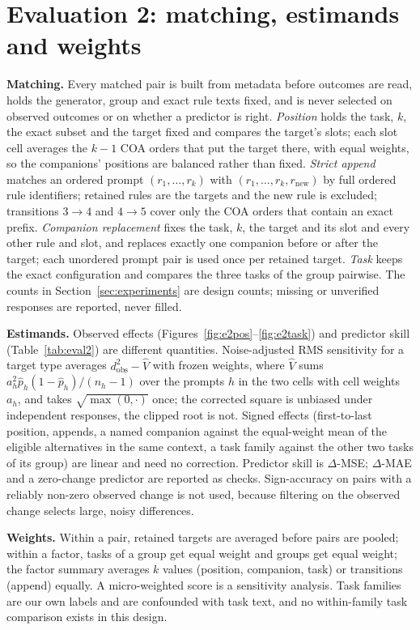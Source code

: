 \documentclass{article}
\newcommand{\phat}{\hat{p}}
\begin{document}
\section{Evaluation 2: matching, estimands and weights}
\label{app:eval2}

\textbf{Matching.} Every matched pair is built from metadata before outcomes are read, holds the generator, group and
exact rule texts fixed, and is never selected on observed outcomes or on whether a predictor is right. \emph{Position}
holds the task, $k$, the exact subset and the target fixed and compares the target's slots; each slot cell averages the
$k-1$ COA orders that put the target there, with equal weights, so the companions' positions are balanced rather than
fixed. \emph{Strict append} matches an ordered prompt $(r_1,\dots,r_k)$ with $(r_1,\dots,r_k,r_{\text{new}})$ by full
ordered rule identifiers; retained rules are the targets and the new rule is excluded; transitions $3\to4$ and
$4\to5$ cover only the COA orders that contain an exact prefix. \emph{Companion replacement} fixes the task, $k$, the
target and its slot and every other rule and slot, and replaces exactly one companion before or after the target; each
unordered prompt pair is used once per retained target. \emph{Task} keeps the exact configuration and compares the
three tasks of the group pairwise. The counts in Section~\ref{sec:experiments} are design counts; missing or
unverified responses are reported, never filled.

\textbf{Estimands.} Observed effects (Figures~\ref{fig:e2pos}--\ref{fig:e2task}) and predictor skill (Table~\ref{tab:eval2}) are different
quantities. Noise-adjusted RMS sensitivity for a target type averages $d_{\text{obs}}^2-\hat V$ with frozen weights,
where $\hat V$ sums $a_h^2\phat_h(1-\phat_h)/(n_h-1)$ over the prompts $h$ in the two cells with cell weights $a_h$, and
takes $\sqrt{\max(0,\cdot)}$ once; the corrected square is unbiased under independent responses, the clipped root is
not. Signed effects (first-to-last position, appends, a named companion against the equal-weight mean of the eligible
alternatives in the same context, a task family against the other two tasks of its group) are linear and need no
correction. Predictor skill is $\Delta$-MSE; $\Delta$-MAE and a zero-change predictor are reported as checks.
Sign-accuracy on pairs with a reliably non-zero observed change is not used, because filtering on the observed change
selects large, noisy differences.

\textbf{Weights.} Within a pair, retained targets are averaged before pairs are pooled; within a factor, tasks of a
group get equal weight and groups get equal weight; the factor summary averages $k$ values (position, companion, task)
or transitions (append) equally. A micro-weighted score is a sensitivity analysis. Task families are our own labels
and are confounded with task text, and no within-family task comparison exists in this design.
\end{document}
